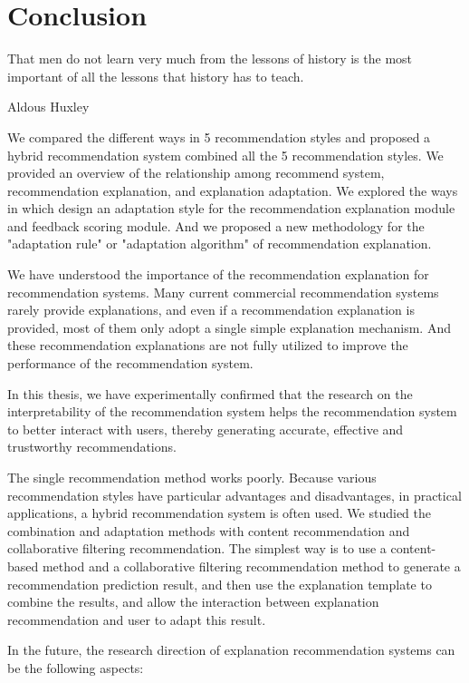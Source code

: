 
\section{Conclusion}
\label{ch:conclusion}

\epigraph{That men do not learn very much from the lessons of history is the most important of all the lessons that history has to teach.}{Aldous Huxley}

We compared the different ways in 5 recommendation styles and proposed a hybrid recommendation system combined all the 5 recommendation styles. We provided an overview of the relationship among recommend system, recommendation explanation, and explanation adaptation. We explored the ways in which design an adaptation style for the recommendation explanation module and feedback scoring module. And we proposed a new methodology for the "adaptation rule" or "adaptation algorithm" of recommendation explanation.
\par We have understood the importance of the recommendation explanation for recommendation systems. Many current commercial recommendation systems rarely provide explanations, and even if a recommendation explanation is provided, most of them only adopt a single simple explanation mechanism. And these recommendation explanations are not fully utilized to improve the performance of the recommendation system.
\par In this thesis, we have experimentally confirmed that the research on the interpretability of the recommendation system helps the recommendation system to better interact with users, thereby generating accurate, effective and trustworthy recommendations. 
\par The single recommendation method works poorly. Because various recommendation styles have particular advantages and disadvantages, in practical applications, a hybrid recommendation system is often used. We studied the combination and adaptation methods with content recommendation and collaborative filtering recommendation. The simplest way is to use a content-based method and a collaborative filtering recommendation method to generate a recommendation prediction result, and then use the explanation template to combine the results, and allow the interaction between explanation recommendation and user to adapt this result.
\\
\par In the future, the research direction of explanation recommendation systems can be the following aspects:

